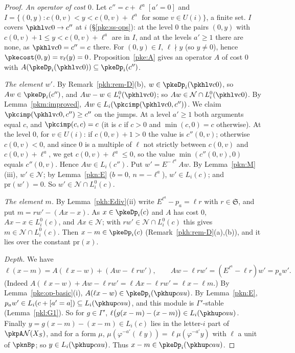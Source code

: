 \documentclass[10pt]{amsart}
\theoremstyle{definition}
\theoremstyle{remark}
\begin{document}
\begin{proof}
\emph{An operator of cost $0$.} Let $c''=c+\ell^a[a'=0]$ and $I=\{(0,y):c(0,v)<y<c(0,v)+\ell^a\text{ for some }
v\in U(i)\}$, a finite set. $I$ covers $\pkhlv c0\to c''$ at $i$ (\S\ref{pke:ss-ops}): at the level $0$ the
pairs $(0,y)$ with $c(0,v)+1\le y<c(0,v)+\ell^a$ are in $I$, and at the levels $a'\ge1$ there are none, as
$\pkhlv c0=c''=c$ there. For $(0,y)\in I$, $\ell\nmid y$ (so $y\ne0$), hence $\pkecost(0,y)=v_\ell(y)=0$.
Proposition~\ref{pke:A} gives an operator $A$ of cost $0$ with $A(\pkeDp_i(\pkhlv c0))\subseteq\pkeDp_i(c'')$.

\emph{The element $w'$.} By Remark~\ref{pkh:rem-D}(b), $w\in\pkeDp_i(\pkhlv c0)$, so $Aw\in\pkeDp_i(c'')$, and
$Aw-w\in L^0_i(\pkhlv c0)$; so $Aw\in\mathcal N\cap L^0_i(\pkhlv c0)$. By Lemma~\ref{pkm:improved}, $Aw\in
L_i(\pkcimp(\pkhlv c0,c''))$. We claim $\pkcimp(\pkhlv c0,c'')\ge c''$ on the jumps. At a level $a'\ge1$ both
arguments equal $c$, and $\pkcimp(c,c)=c$ (it is $c$ if $c>0$ and $\min(c,0)=c$ otherwise). At the level $0$,
for $v\in U(i)$: if $c(0,v)+1>0$ the value is $c''(0,v)$; otherwise $c(0,v)<0$, and since $0$ is a multiple of
$\ell$ not strictly between $c(0,v)$ and $c(0,v)+\ell^a$, we get $c(0,v)+\ell^a\le0$, so the value
$\min(c''(0,v),0)$ equals $c''(0,v)$. Hence $Aw\in L_i(c'')$. Put $w'=E^{-\ell^a}Aw$. By Lemma~\ref{pkn:M}(iii),
$w'\in\mathcal N$; by Lemma~\ref{pkn:E} ($b=0$, $n=-\ell^a$), $w'\in L_i(c)$; and $\mathrm{pr}(w')=0$. So
$w'\in\mathcal N\cap L^0_i(c)$.

\emph{The element $m$.} By Lemma~\ref{pkh:Ediv}(ii) write $E^{\ell^a}-p_a=\ell r$ with $r\in\mathfrak S$, and put
$m=rw'-(Ax-x)$. As $x\in\pkeDp_i(c)$ and $A$ has cost $0$, $Ax-x\in L^0_i(c)$, and $Ax\in\mathcal N$; with
$rw'\in\mathcal N\cap L^0_i(c)$ this gives $m\in\mathcal N\cap L^0_i(c)$. Then $x-m\in\pkeDp_i(c)$
(Remark~\ref{pkh:rem-D}(a),(b)), and it lies over the constant $\mathrm{pr}(x)$.

\emph{Depth.} We have
\[
\ell(x-m)=A(\ell x-w)+(Aw-\ell rw'),\qquad Aw-\ell rw'=(E^{\ell^a}-\ell r)w'=p_aw'.
\]
(Indeed $A(\ell x-w)+Aw-\ell rw'=\ell Ax-\ell rw'=\ell x-\ell m$.) By Lemma~\ref{pke:op-basic}(i), $A(\ell
x-w)\in\pkeDp_i(\pkhup cau)$. By Lemma~\ref{pkn:E}, $p_aw'\in L_i(c+[a'=a])\subseteq L_i(\pkhup cau)$, and this
module is $\Gamma'$-stable (Lemma~\ref{pkl:G1}). So for $g\in\Gamma'$, $\ell\bigl(g(x-m)-(x-m)\bigr)\in L_i(\pkhup
cau)$. Finally $y=g(x-m)-(x-m)\in L_i(c)$ lies in the letter-$i$ part of $\pkpA\mathcal N(X_S)$, and for a form
$\mu$, $\mu(\varphi^{-a'}(\ell y))=\ell\mu(\varphi^{-a'}y)$ with $\ell$ a unit of $\pknBp$; so $y\in L_i(\pkhup
cau)$. Thus $x-m\in\pkeDp_i(\pkhup cau)$.
\end{proof}
\end{document}
